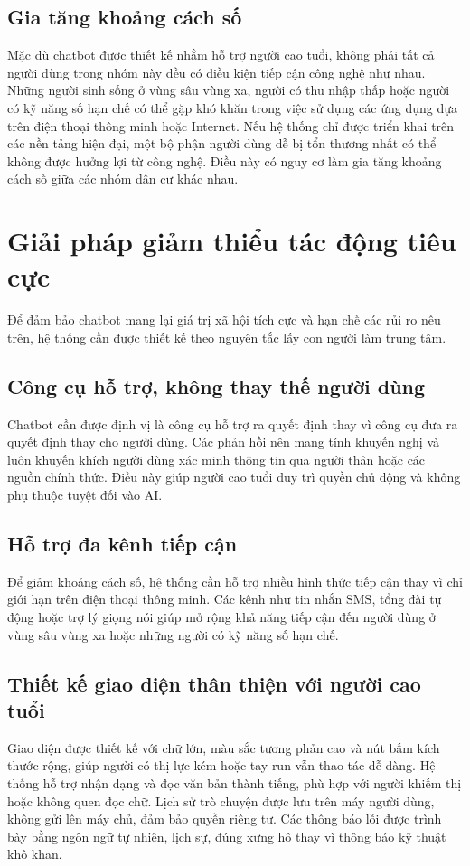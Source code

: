 \subsection{Gia tăng khoảng cách số}
Mặc dù chatbot được thiết kế nhằm hỗ trợ người cao tuổi, không phải tất cả người dùng trong nhóm này đều có điều kiện tiếp cận công nghệ như nhau. Những người sinh sống ở vùng sâu vùng xa, người có thu nhập thấp hoặc người có kỹ năng số hạn chế có thể gặp khó khăn trong việc sử dụng các ứng dụng dựa trên điện thoại thông minh hoặc Internet.
Nếu hệ thống chỉ được triển khai trên các nền tảng hiện đại, một bộ phận người dùng dễ bị tổn thương nhất có thể không được hưởng lợi từ công nghệ. Điều này có nguy cơ làm gia tăng khoảng cách số giữa các nhóm dân cư khác nhau.

\section{Giải pháp giảm thiểu tác động tiêu cực}
Để đảm bảo chatbot mang lại giá trị xã hội tích cực và hạn chế các rủi ro nêu trên, hệ thống cần được thiết kế theo nguyên tắc lấy con người làm trung tâm.

\subsection{Công cụ hỗ trợ, không thay thế người dùng}
Chatbot cần được định vị là công cụ hỗ trợ ra quyết định thay vì công cụ đưa ra quyết định thay cho người dùng. Các phản hồi nên mang tính khuyến nghị và luôn khuyến khích người dùng xác minh thông tin qua người thân hoặc các nguồn chính thức. Điều này giúp người cao tuổi duy trì quyền chủ động và không phụ thuộc tuyệt đối vào AI.

\subsection{Hỗ trợ đa kênh tiếp cận}
Để giảm khoảng cách số, hệ thống cần hỗ trợ nhiều hình thức tiếp cận thay vì chỉ giới hạn trên điện thoại thông minh. Các kênh như tin nhắn SMS, tổng đài tự động hoặc trợ lý giọng nói giúp mở rộng khả năng tiếp cận đến người dùng ở vùng sâu vùng xa hoặc những người có kỹ năng số hạn chế.

\subsection{Thiết kế giao diện thân thiện với người cao tuổi}
Giao diện được thiết kế với chữ lớn, màu sắc tương phản cao và nút bấm kích thước rộng, giúp người có thị lực kém hoặc tay run vẫn thao tác dễ dàng. Hệ thống hỗ trợ nhận dạng và đọc văn bản thành tiếng, phù hợp với người khiếm thị hoặc không quen đọc chữ. Lịch sử trò chuyện được lưu trên máy người dùng, không gửi lên máy chủ, đảm bảo quyền riêng tư. Các thông báo lỗi được trình bày bằng ngôn ngữ tự nhiên, lịch sự, đúng xưng hô thay vì thông báo kỹ thuật khô khan.


